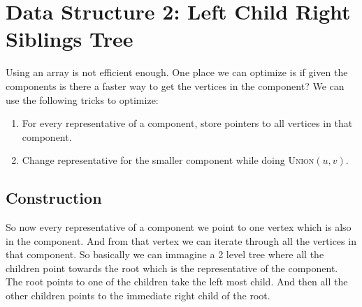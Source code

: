 \section{Data Structure 2: Left Child Right Siblings Tree}
Using an array is not efficient enough.  One place we can optimize is if given the components is there a faster way to get the vertices in the component?  We can use the following tricks to optimize:
\begin{enumerate}[]
	\item For every representative of a component, store pointers to all vertices in that component.
	\item Change representative for the smaller component while doing \textsc{Union}$(u,v)$.
\end{enumerate}
\subsection{Construction}
So now every representative of a component we point to one vertex which is also in the component. And from that vertex we can iterate through all the vertices in that component. So basically we can immagine a 2 level tree where all the children point towards the root which is the representative of the component. The root points to one of the children take the left most child. And then all the other children points to the immediate right child of the root.
